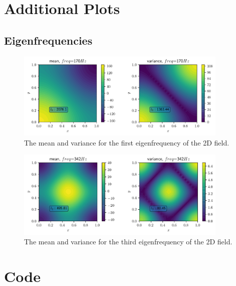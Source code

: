 \documentclass[%
  a4paper,oneside,%
  11pt,%
  smallchapters,
  style=printdev,
  extramargin,
  green,%
  rgb, <cmyk>
  ]{tubsbook}
\begin{document}
\appendix
\renewcommand{\thesection}{\Alph{section}.\arabic{section}}
\setcounter{section}{0}
\begin{appendices}

\chapter{Additional Plots}

\section*{Eigenfrequencies}
\begin{figure}[!ht]
\begin{center}
\includegraphics[width=0.9\textwidth]{pics/Freq170}
\caption{The mean and variance for the first eigenfrequency of the 2D field.}
\label{fig:Eigen170}
\end{center}
\end{figure}

\begin{figure}[!ht]
\begin{center}
\includegraphics[width=0.9\textwidth]{pics/Freq342}
\caption{The mean and variance for the third eigenfrequency of the 2D field.}
\label{fig:Eigen342}
\end{center}
\end{figure}



\chapter{Code}


\end{appendices}
\end{document}
